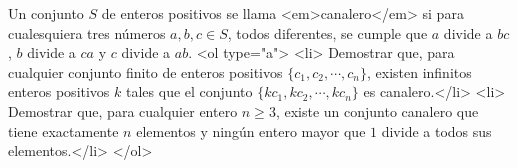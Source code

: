 Un conjunto $S$ de enteros positivos se llama <em>canalero</em> si para cualesquiera tres números $a,b,c \in S$, todos diferentes, se cumple que $a$ divide a $bc$, $b$ divide a $ca$ y $c$ divide a $ab$.
<ol type="a">
  <li> Demostrar que, para cualquier conjunto finito de enteros positivos $\{c_1,c_2, \cdots , c_n\}$, existen infinitos enteros positivos $k$ tales que el conjunto $\{ kc_1, kc_2, \cdots , kc_n \}$ es canalero.</li>
  <li> Demostrar que, para cualquier entero $n \geq 3$, existe un conjunto canalero que tiene exactamente $n$ elementos y ningún entero mayor que $1$ divide a todos sus elementos.</li>
</ol>
